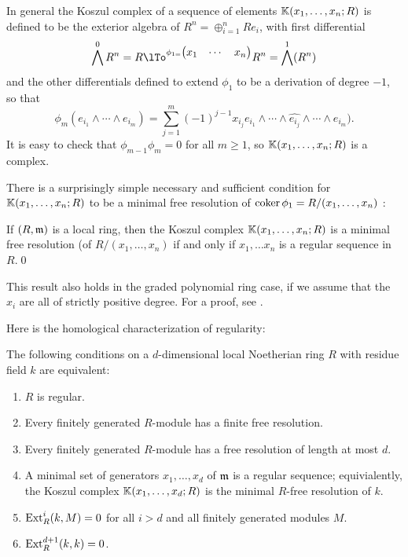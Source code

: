 \begin{example}
In general the Koszul complex of a sequence of elements
${\mathbb K}(x_{1}, \dots, x_{n}; R)$ is defined to be the exterior algebra of $R^{n}= \oplus_{i=1}^{n} Re_{i}$, with first differential
$$
\bigwedge^{0}R^{n} = R \lTo ^{
\phi_{1 = }\begin{pmatrix}
 x_{1}&\cdots&x_{n} 
\end{pmatrix}
}
R^{n}=\bigwedge^{1}(R^{n}) 
$$
and the other differentials defined to extend $\phi_{1}$ to be a derivation of degree $-1$, so that 
$$
\phi_{m}(e_{i_1}\wedge \cdots \wedge e_{i_{m}})
= \sum_{j= 1}^{m} (-1)^{j-1}x_{i_{j}} e_{i_{1}}\wedge\cdots \wedge \widehat{e_{i_{j}}}\wedge \cdots \wedge e_{i_{m}}).
$$
It is easy to check that $\phi_{m-1}\phi_{m} = 0$ for all $m\geq 1$, so ${\mathbb K}(x_{1}, \dots, x_{n}; R)$ is a complex.

There is a surprisingly simple necessary and sufficient condition for 
${\mathbb K}(x_{1}, \dots, x_{n};R)$
to be a minimal free resolution of ${\rm{coker}\,} \phi_{1} = R/(x_{1}, \dots, x_{n})$ \cite[]{E}:

\begin{theorem} If $(R,\mathfrak m)$ is a local ring, then
 the Koszul complex ${\mathbb K}(x_{1}, \dots, x_{n};R)$ is a minimal free resolution (of $R/(x_{1}, \dots, x_{n})$ if and only if 
$x_{1},\dots x_{n}$ is a regular sequence in $R$.\qed
\end{theorem}
This result also holds in the graded polynomial ring case, if we assume that the $x_{i}$ are all of
strictly positive degree. For a proof, see \cite[Theorem 17.6]{E}.
\end{example}


Here is the homological characterization of regularity:

% 

\begin{theorem}\label{regularity characterized}\label{ABS}
The following conditions on a $d$-dimensional local Noetherian ring $R$ with residue field $k$ are equivalent:
\begin{enumerate}
 \item $R$ is regular.
\item Every finitely generated $R$-module has a finite free resolution.
\item Every finitely generated $R$-module has a  free resolution of length at most $d$.
\item A minimal set of generators $x_{1},\dots, x_{d}$ of $\mathfrak m$ is a regular sequence; equivialently,
the Koszul complex ${\mathbb K}(x_{1},\dots, x_{d};R)$ is the minimal  $R$-free resolution of  $k$.
\item ${\rm{Ext}}_R^{i}(k,M) = 0$ for all $i>d$ and all finitely generated modules $M$.
\item ${\rm{Ext}}_R^{d+1}(k,k) = 0$.
\end{enumerate}
\end{theorem}

